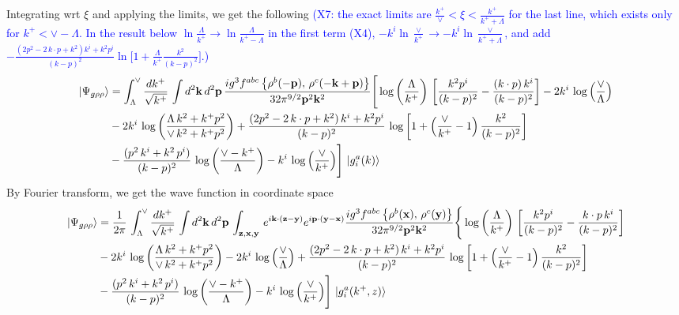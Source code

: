 \documentclass[10pt]{article}
\def\v#1{\mathbf{#1}}
\numberwithin{equation}{section}
\begin{document}
Integrating wrt $\xi$ and applying the limits, we get the following \textcolor{blue}{(X7: the exact limits are $\frac{k^+}{\vee}<\xi<\frac{k^+}{k^++\Lambda}$ for the last line, which exists only for $k^+<\vee-\Lambda$. In the result below $\ln\frac{\Lambda}{k^+}\to\ln\frac{\Lambda}{k^+-\Lambda}$ in the first term (X4), $-k^{i}\ln\frac{\vee}{k^+}\to-k^{i}\ln\frac{\vee}{k^++\Lambda}$, and add $-\frac{(2p^{2}-2\,k\cdot p+k^{2})k^{i}+k^{2}p^{i}}{(k-p)^{2}}\ln\big[1+\frac{\Lambda}{k^+}\frac{k^{2}}{(k-p)^{2}}\big]$.)}
\begin{align}
    \left|\Psi_{g\rho\rho}\right\rangle & =  \int_{\Lambda}^{\vee}\frac{dk^{+}}{\sqrt{k^{+}}}\,\int d^{2}\mathbf{k}\, d^{2}\mathbf{p}\,\frac{ig^{3}f^{abc}\left\{ \rho^{b}(-\mathbf{p}),\,\rho^{c}(-\mathbf{k}+\mathbf{p})\right\}}{32\pi^{9/2}\mathbf{p}^{2}\mathbf{k}^{2}}\Bigg[\log{\left(\frac{\Lambda}{k^{+}}\right)}\,\left[\frac{k^{2}p^{i}}{(k-p)^{2}}-\frac{(k\cdot p)\,k^{i}}{(k-p)^{2}}\right]-2k^{i}\,\log{\left(\frac{\vee}{\Lambda}\right)}\notag \\ & -2k^{i}\,\log{\left(\frac{\Lambda\,k^{2} + k^{+}p^{2}}{\vee\, k^{2}+k^{+}p^{2}}\right)}+\frac{(2p^{2}-2\,k\cdot p + k^{2})\,k^{i} + k^{2}p^{i}}{(k-p)^{2}}\, \log{\left[1+\left(\frac{\vee}{k^{+}}-1\right)\frac{k^{2}}{(k-p)^{2}}\right]}\notag \\ & - \frac{(p^{2}\,k^{i}+k^{2}\,p^{i})}{(k-p)^{2}}\, \log{\left(\frac{\vee - k^{+}}{\Lambda}\right)}-k^{i}\, \log{\left(\frac{\vee}{k^{+}}\right)}\Bigg]\, \ket{g^{a}_{i}(k)}
\end{align}
By Fourier transform, we get the wave function in coordinate space
\begin{align}
    \left|\Psi_{g\rho\rho}\right\rangle & =  \frac{1}{2\pi}\,\int_{\Lambda}^{\vee}\frac{dk^{+}}{\sqrt{k^{+}}}\,\int d^{2}\mathbf{k}\, d^{2}\mathbf{p}\,\int_{\v{z},\v{x},\v{y}}\, e^{i\v{k}\cdot (\v{z}-\v{y})} e^{i\v{p}\cdot (\v{y}-\v{x})}\frac{ig^{3}f^{abc}\left\{ \rho^{b}(\mathbf{x}),\,\rho^{c}(\mathbf{y})\right\}}{32\pi^{9/2}\mathbf{p}^{2}\mathbf{k}^{2}}\Bigg\{\log{\left(\frac{\Lambda}{k^{+}}\right)}\,\left[\frac{k^{2}p^{i}}{(k-p)^{2}}-\frac{k\cdot p\,k^{i}}{(k-p)^{2}}\right]\notag \\ & -2k^{i}\,\log{\left(\frac{\Lambda\,k^{2} + k^{+}p^{2}}{\vee\, k^{2}+k^{+}p^{2}}\right)}-2k^{i}\,\log{\left(\frac{\vee}{\Lambda}\right)}+\frac{(2p^{2}-2\,k\cdot p + k^{2})\,k^{i} + k^{2}p^{i}}{(k-p)^{2}}\, \log{\left[1+\left(\frac{\vee}{k^{+}}-1\right)\frac{k^{2}}{(k-p)^{2}}\right]}\notag \\ & - \frac{(p^{2}\,k^{i}+k^{2}\,p^{i})}{(k-p)^{2}}\, \log{\left(\frac{\vee - k^{+}}{\Lambda}\right)}-k^{i}\, \log{\left(\frac{\vee}{k^{+}}\right)}\Bigg]\, \ket{g^{a}_{i}(k^{+},z)}
\end{align}
\end{document}
